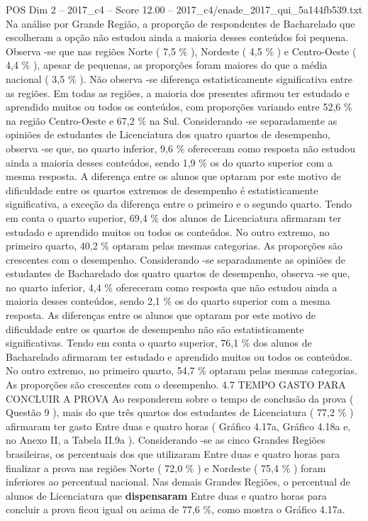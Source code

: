 \begin{textsample}{POS Dim 2 – 2017\_c4 – Score 12.00 – 2017\_c4/enade\_2017\_qui\_5a144fb539.txt}
Na análise por Grande Região, a proporção de respondentes de Bacharelado que escolheram a opção não estudou ainda a maioria desses conteúdos foi pequena.
Observa -se que nas regiões Norte ( 7,5 \% ), Nordeste ( 4,5 \% ) e Centro-Oeste ( 4,4 \% ), apesar de pequenas, as proporções foram maiores do que a média nacional ( 3,5 \% ).
Não observa -se diferença estatisticamente significativa entre as regiões.
Em todas as regiões, a maioria dos presentes afirmou ter estudado e aprendido muitos ou todos os conteúdos, com proporções variando entre 52,6 \% na região Centro-Oeste e 67,2 \% na Sul.
Considerando -se separadamente as opiniões de estudantes de Licenciatura dos quatro quartos de desempenho, observa -se que, no quarto inferior, 9,6 \% ofereceram como resposta não estudou ainda a maioria desses conteúdos, sendo 1,9 \% os do quarto superior com a mesma resposta.
A diferença entre os alunos que optaram por este motivo de dificuldade entre os quartos extremos de desempenho é estatisticamente significativa, a exceção da diferença entre o primeiro e o segundo quarto.
Tendo em conta o quarto superior, 69,4 \% dos alunos de Licenciatura afirmaram ter estudado e aprendido muitos ou todos os conteúdos.
No outro extremo, no primeiro quarto, 40,2 \% optaram pelas mesmas categorias.
As proporções são crescentes com o desempenho.
Considerando -se separadamente as opiniões de estudantes de Bacharelado dos quatro quartos de desempenho, observa -se que, no quarto inferior, 4,4 \% ofereceram como resposta que não estudou ainda a maioria desses conteúdos, sendo 2,1 \% os do quarto superior com a mesma resposta.
As diferenças entre os alunos que optaram por este motivo de dificuldade entre os quartos de desempenho não são estatisticamente significativas.
Tendo em conta o quarto superior, 76,1 \% dos alunos de Bacharelado afirmaram ter estudado e aprendido muitos ou todos os conteúdos.
No outro extremo, no primeiro quarto, 54,7 \% optaram pelas mesmas categorias.
As proporções são crescentes com o desempenho. 4.7 TEMPO GASTO PARA CONCLUIR A PROVA Ao responderem sobre o tempo de conclusão da prova ( Questão 9 ), mais do que três quartos dos estudantes de Licenciatura ( 77,2 \% ) afirmaram ter gasto Entre duas e quatro horas ( Gráfico 4.17a, Gráfico 4.18a e, no Anexo II, a Tabela II.9a ).
Considerando -se as cinco Grandes Regiões brasileiras, os percentuais dos que utilizaram Entre duas e quatro horas para finalizar a prova nas regiões Norte ( 72,0 \% ) e Nordeste ( 75,4 \% ) foram inferiores ao percentual nacional.
Nas demais Grandes Regiões, o percentual de alunos de Licenciatura que \textbf{dispensaram} Entre duas e quatro horas para concluir a prova ficou igual ou acima de 77,6 \%, como mostra o Gráfico 4.17a.

\end{textsample}
